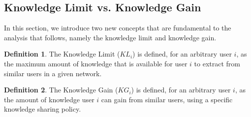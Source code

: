 \documentclass[12pt,epsf]{article}
\theoremstyle{definition}
\newtheorem{defn}{Definition}[section]
\begin{document}
%
%
\vspace{-0.5 cm}
\subsection{Knowledge Limit vs. Knowledge Gain}
\vspace{-0.2 cm}
In this section, we introduce two new concepts that are fundamental to the analysis that follows, namely the knowledge 
limit and knowledge gain.

\begin{defn}
The Knowledge Limit ($KL_i$) is defined, for an arbitrary user $i$, as the maximum amount of knowledge that is available for user $i$ to extract from similar users in a given network.
\end{defn}

\begin{defn}
The Knowledge Gain ($KG_i$) is defined, for an arbitrary user $i$, as the amount of knowledge user $i$ can gain from similar users, using a specific knowledge sharing policy.
\end{defn}
\end{document}
